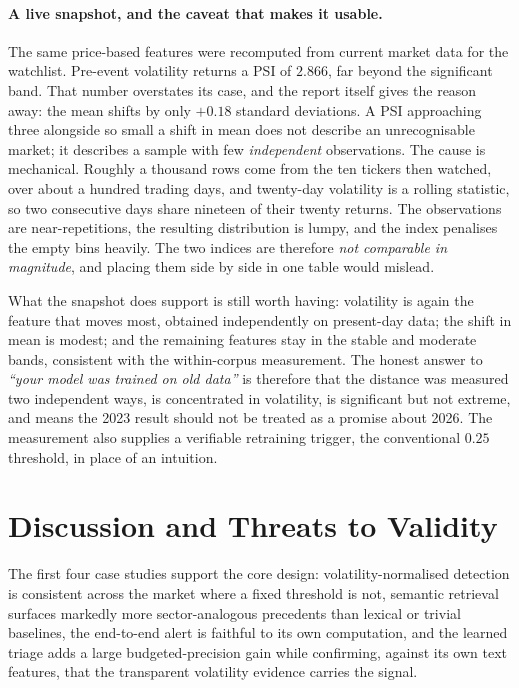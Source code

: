 \paragraph{A live snapshot, and the caveat that makes it usable.} The same price-based features were
recomputed from current market data for the watchlist. Pre-event volatility returns a PSI of $2.866$,
far beyond the significant band. That number overstates its case, and the report itself gives the
reason away: the mean shifts by only $+0.18$ standard deviations. A PSI approaching three alongside
so small a shift in mean does not describe an unrecognisable market; it describes a sample with few
\emph{independent} observations. The cause is mechanical. Roughly a thousand rows come from the ten
tickers then watched, over about a hundred trading days, and twenty-day volatility is a rolling statistic, so two
consecutive days share nineteen of their twenty returns. The observations are near-repetitions, the
resulting distribution is lumpy, and the index penalises the empty bins heavily. The two indices are
therefore \emph{not comparable in magnitude}, and placing them side by side in one table would
mislead.

What the snapshot does support is still worth having: volatility is again the feature that moves
most, obtained independently on present-day data; the shift in mean is modest; and the remaining
features stay in the stable and moderate bands, consistent with the within-corpus measurement. The
honest answer to \emph{``your model was trained on old data''} is therefore that the distance was
measured two independent ways, is concentrated in volatility, is significant but not extreme, and
means the 2023 result should not be treated as a promise about 2026. The measurement also supplies a
verifiable retraining trigger, the conventional $0.25$ threshold, in place of an intuition.

\section{Discussion and Threats to Validity}
\label{sec:cs_discussion}

The first four case studies support the core design: volatility-normalised detection is consistent
across the market where a fixed threshold is not, semantic retrieval surfaces markedly more
sector-analogous precedents than lexical or trivial baselines, the end-to-end alert is faithful to
its own computation, and the learned triage adds a large budgeted-precision gain while confirming,
against its own text features, that the transparent volatility evidence carries the signal.

